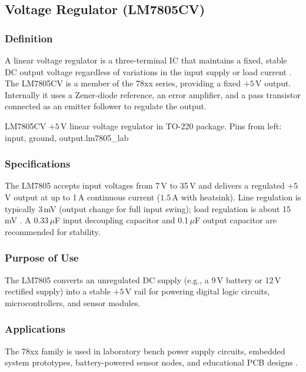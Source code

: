 \subsection{Voltage Regulator (LM7805CV)}

\subsubsection*{Definition}
A linear voltage regulator is a three-terminal IC that maintains a fixed, stable DC
output voltage regardless of variations in the input supply or load current
\cite{sedra2020}. The LM7805CV is a member of the 78xx series, providing a fixed
$+5$\,V output. Internally it uses a Zener-diode reference, an error amplifier, and a
pass transistor connected as an emitter follower to regulate the output.

%
  {LM7805CV $+5$\,V linear voltage regulator in TO-220 package. Pins
   from left: input, ground, output.}{lm7805_lab}

\subsubsection*{Specifications}
The LM7805 accepts input voltages from 7\,V to 35\,V and delivers a regulated $+5$\,V
output at up to 1\,A continuous current ($1.5$\,A with heatsink). Line regulation is
typically 3\,mV (output change for full input swing); load regulation is about 15\,mV
\cite{boylestad2015}. A 0.33\,$\mu$F input decoupling capacitor and 0.1\,$\mu$F output
capacitor are recommended for stability.

\subsubsection*{Purpose of Use}
The LM7805 converts an unregulated DC supply (e.g., a 9\,V battery or 12\,V rectified
supply) into a stable $+5$\,V rail for powering digital logic circuits, microcontrollers,
and sensor modules.

\subsubsection*{Applications}
The 78xx family is used in laboratory bench power supply circuits, embedded system
prototypes, battery-powered sensor nodes, and educational PCB designs \cite{floyd2012}.
